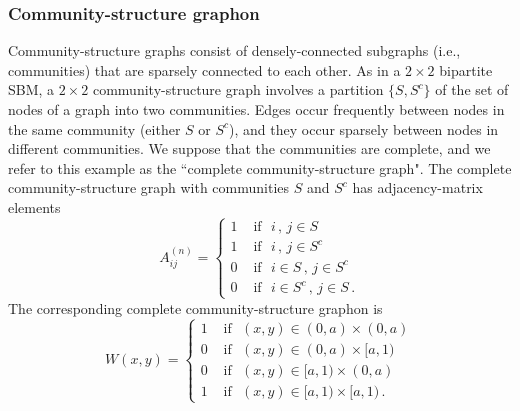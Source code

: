 \documentclass[11pt]{amsart}
\numberwithin{equation}{section}
\begin{document}
{%

\subsubsection{Community-structure graphon}

Community-structure graphs consist of densely-connected subgraphs (i.e., communities) that are sparsely connected to each other. As in a $2 \times 2$ bipartite SBM, a $2 \times 2$ community-structure graph involves a partition $\{S,S^c\}$ of the set of nodes of a graph into two communities. Edges occur frequently between nodes in the same community (either $S$ or $S^c$), and they occur sparsely between nodes in different communities. We suppose that the communities are complete, and we refer to this example as the ``complete community-structure graph". The complete community-structure graph with communities $S$ and $S^c$ has adjacency-matrix elements 
\begin{equation}\label{eq: community graph}
    A^{(n)}_{ij} = \begin{cases}
        1 &\text{ if }\,\, i\,, \,j \in S
        \\
        1 &\text{ if } \,\,i\,, \,j \in S^c
        \\
        0 &\text{ if } \,\,i \in S\,,\,  j\in S^c
        \\
        0 &\text{ if } \,\,i \in S^c\,,\,  j \in S \,. 
    \end{cases}
\end{equation}
The corresponding complete community-structure graphon is
\begin{equation}\label{eq: community graphon}
	W(x,y) = 
		\begin{cases}
	1 &\text{ if } \,\, (x,y)\in (0,a) \times (0,a) \\
	0 &\text{ if  } \,\, (x,y)\in (0,a)\times [a,1) \\
	0 &\text{ if  } \,\, (x,y)\in [a,1) \times (0,a) \\
	1 &\text{ if  } \,\, (x,y)\in [a,1) \times [a,1)\,.
		\end{cases} 
\end{equation}

}
\end{document}
